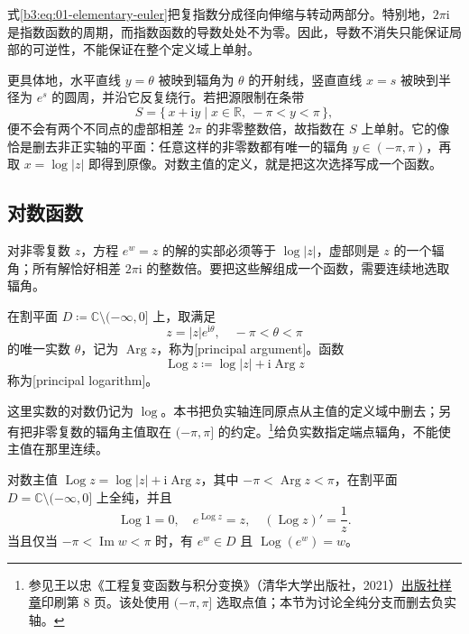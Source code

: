 式\eqref{b3:eq:01-elementary-euler}把复指数分成径向伸缩与转动两部分。特别地，\(2\pi\mathrm{i}\) 是指数函数的周期，而指数函数的导数处处不为零。因此，导数不消失只能保证局部的可逆性，不能保证在整个定义域上单射。

更具体地，水平直线 \(y=\theta\) 被映到辐角为 \(\theta\) 的开射线，竖直直线 \(x=s\) 被映到半径为 \(e^s\) 的圆周，并沿它反复绕行。若把源限制在条带
\[
 S=\{\,x+\mathrm{i}y\mid x\in\mathbb R,\ -\pi<y<\pi\,\},
\]
便不会有两个不同点的虚部相差 \(2\pi\) 的非零整数倍，故指数在 \(S\) 上单射。它的像恰是删去非正实轴的平面：任意这样的非零数都有唯一的辐角 \(y\in(-\pi,\pi)\)，再取 \(x=\log|z|\) 即得到原像。对数主值的定义，就是把这次选择写成一个函数。

\subsection{对数函数}
\label{b3:subsec:010302}

对非零复数 \(z\)，方程 \(e^w=z\) 的解的实部必须等于 \(\log|z|\)，虚部则是 \(z\) 的一个辐角；所有解恰好相差 \(2\pi\mathrm{i}\) 的整数倍。要把这些解组成一个函数，需要连续地选取辐角。

\begin{definition}
\label{b3:def:01-elementary-log}
在割平面 \(D\coloneqq\mathbb C\setminus(-\infty,0]\) 上，取满足
\[
z=|z|e^{\mathrm{i}\theta},\quad -\pi<\theta<\pi
\]
的唯一实数 \(\theta\)，记为 \(\operatorname{Arg}z\)，称为[principal argument]。函数
\[
\operatorname{Log}z\coloneqq\log|z|+\mathrm{i}\operatorname{Arg}z
\]
称为[principal logarithm]。
\end{definition}

这里实数的对数仍记为 \(\log\)。本书把负实轴连同原点从主值的定义域中删去；另有把非零复数的辐角主值取在 \((-\pi,\pi]\) 的约定。\footnote{参见王以忠《工程复变函数与积分变换》（清华大学出版社，2021）\href{https://www.tup.tsinghua.edu.cn/upload/books/yz/091462-01.pdf}{出版社样章}印刷第 8 页。该处使用 \((-\pi,\pi]\) 选取点值；本节为讨论全纯分支而删去负实轴。}给负实数指定端点辐角，不能使主值在那里连续。

\begin{proposition}
\label{b3:prop:01-elementary-principal-log}
对数主值 \(\operatorname{Log}z=\log|z|+\mathrm{i}\operatorname{Arg}z\)，其中 \(-\pi<\operatorname{Arg}z<\pi\)，在割平面 \(D=\mathbb C\setminus(-\infty,0]\) 上全纯，并且
\[
\operatorname{Log}1=0,
\quad e^{\operatorname{Log}z}=z,
\quad (\operatorname{Log}z)'=\frac1z.
\]
当且仅当 \(-\pi<\operatorname{Im}w<\pi\) 时，有 \(e^w\in D\) 且 \(\operatorname{Log}(e^w)=w\)。
\end{proposition}

